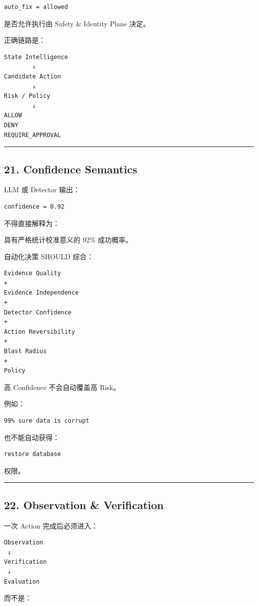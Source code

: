 \documentclass[11pt,a4paper]{article}
\begin{document}
\begin{lstlisting}[language=text]
auto_fix = allowed
\end{lstlisting}
是否允许执行由 Safety \& Identity Plane 决定。

正确链路是：

\begin{lstlisting}[language=text]
State Intelligence
        ↓
Candidate Action
        ↓
Risk / Policy
        ↓
ALLOW
DENY
REQUIRE_APPROVAL
\end{lstlisting}
\vspace{0.5em}\hrule\vspace{0.5em}
\subsection{21. Confidence Semantics}
LLM 或 Detector 输出：

\begin{lstlisting}[language=text]
confidence = 0.92
\end{lstlisting}
不得直接解释为：

\begin{gfmBlockquote}
具有严格统计校准意义的 92\% 成功概率。
\end{gfmBlockquote}
自动化决策 SHOULD 综合：

\begin{lstlisting}[language=text]
Evidence Quality
+
Evidence Independence
+
Detector Confidence
+
Action Reversibility
+
Blast Radius
+
Policy
\end{lstlisting}
高 Confidence 不会自动覆盖高 Risk。

例如：

\begin{lstlisting}[language=text]
99% sure data is corrupt
\end{lstlisting}
也不能自动获得：

\begin{lstlisting}[language=text]
restore database
\end{lstlisting}
权限。

\vspace{0.5em}\hrule\vspace{0.5em}
\subsection{22. Observation \& Verification}
一次 Action 完成后必须进入：

\begin{lstlisting}[language=text]
Observation
 ↓
Verification
 ↓
Evaluation
\end{lstlisting}
而不是：
\end{document}
